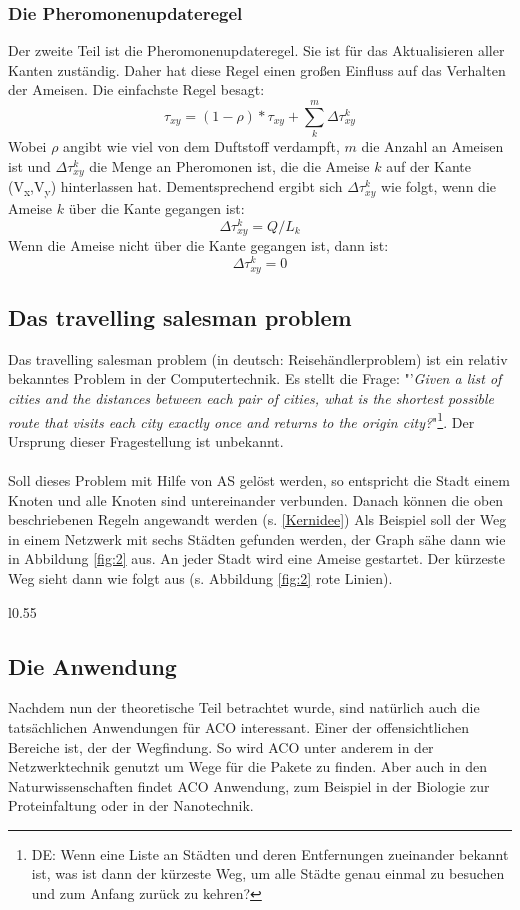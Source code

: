 \documentclass[12pt]{article}
\begin{document}
\subsubsection{Die Pheromonenupdateregel}
Der zweite Teil ist die Pheromonenupdateregel. Sie ist für das Aktualisieren aller Kanten zuständig. Daher hat diese Regel einen großen Einfluss auf das Verhalten der Ameisen. Die einfachste Regel besagt: \[\tau_{xy}= (1-\rho)*\tau_{xy}+\sum_{k}^{m}{ \Delta\tau^k_{xy}} \]
Wobei $\rho$ angibt wie viel von dem Duftstoff verdampft, $m$ die Anzahl an Ameisen ist und $\Delta\tau^k_{xy}$ die Menge an Pheromonen ist, die die Ameise $k$ auf der Kante (V\textsubscript{x},V\textsubscript{y}) hinterlassen hat. Dementsprechend ergibt sich $\Delta\tau^k_{xy}$ wie folgt, wenn die Ameise $k$ über die Kante gegangen ist:\[\Delta\tau^k_{xy}=Q/L_k\] Wenn die Ameise nicht über die Kante gegangen ist, dann ist: \[\Delta\tau^k_{xy}=0\]
\subsection{Das travelling salesman problem}\label{TSP}
Das travelling salesman problem (in deutsch: Reisehändlerproblem) ist ein relativ bekanntes Problem 
in der Computertechnik. Es stellt die Frage:
"'\textit{Given a list of cities and the distances between each pair of cities, what is the shortest possible route that visits each city exactly once and returns to the origin city?}"\cite{wiki_TSP}\footnote{DE: Wenn eine Liste an Städten und deren Entfernungen zueinander bekannt ist, was ist dann der kürzeste Weg, um alle Städte genau einmal zu besuchen und zum Anfang zurück zu kehren?}. Der Ursprung dieser Fragestellung ist unbekannt.\\\\
Soll dieses Problem mit Hilfe von AS gelöst werden, so entspricht die Stadt einem Knoten und alle Knoten sind untereinander verbunden. Danach können die oben beschriebenen Regeln angewandt werden (s. \ref{Kernidee})
Als Beispiel soll der Weg in einem Netzwerk mit sechs Städten gefunden werden, der Graph sähe dann wie in Abbildung \ref{fig:2} aus. An jeder Stadt wird eine Ameise gestartet. Der kürzeste Weg \cite{aco-sim} sieht dann wie folgt aus (s. Abbildung \ref{fig:2} rote Linien).
\begin{wrapfigure}[13]{l}{0.55\textwidth}
\centering
{}
\caption{Netzwerk an Städten}
\label{fig:2}
\end{wrapfigure}
\subsection{Die Anwendung}
Nachdem nun der theoretische Teil betrachtet wurde, sind natürlich auch die tatsächlichen Anwendungen für ACO interessant. Einer der offensichtlichen Bereiche ist, der der Wegfindung. So wird ACO unter anderem in der Netzwerktechnik genutzt um Wege für die Pakete zu finden. Aber auch in den Naturwissenschaften findet ACO Anwendung, zum Beispiel in der Biologie zur Proteinfaltung oder in der Nanotechnik. 
\end{document}
